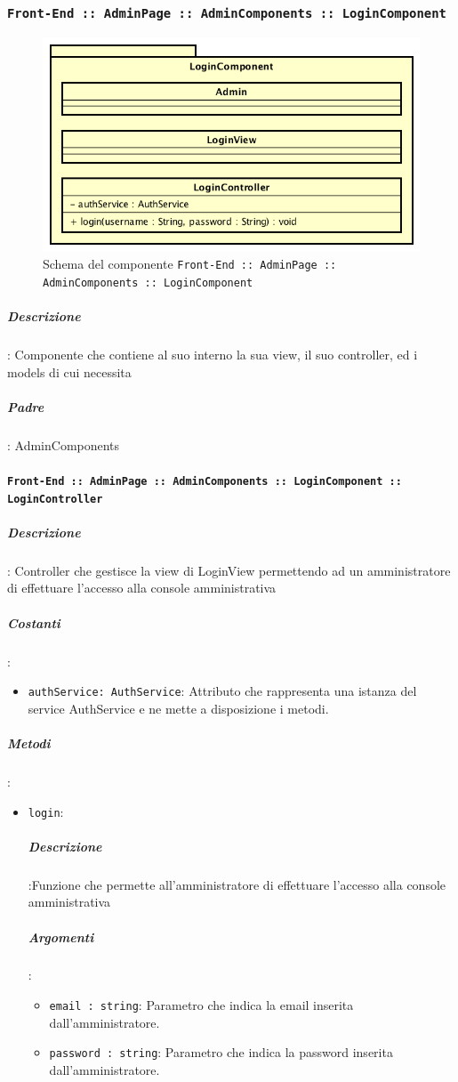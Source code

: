 \documentclass[../DefinizioneDiProdotto_v3.0.0.tex]{subfiles}
\begin{document}
\newpage
	\subsubsection{\texttt{Front-End :: AdminPage :: AdminComponents :: LoginComponent}}
	\begin{figure}[!h]
		\centering
		\includegraphics[scale=0.7]{Architettura/Front-End/AdminPage/AdminComponents/LoginComponent.png}
		\caption{Schema del componente \texttt{Front-End :: AdminPage :: AdminComponents :: LoginComponent}}
	\end{figure}
			\subparagraph{Descrizione}: Componente che contiene al suo interno la sua view, il suo controller, ed i models di cui necessita
			\subparagraph{Padre}: AdminComponents
			\paragraph{\texttt{Front-End :: AdminPage :: AdminComponents :: LoginComponent :: LoginController}}
				\subparagraph{Descrizione}: Controller che gestisce la view di LoginView permettendo ad un amministratore di effettuare l'accesso alla console amministrativa
				\subparagraph{Costanti}:
				\begin{itemize}
					\item \texttt{authService: AuthService}: Attributo che rappresenta una istanza del service AuthService e ne mette a disposizione i metodi.
				\end{itemize}
				\subparagraph{Metodi}:
				\begin{itemize}
					\item \texttt{login}:
					\subparagraph{Descrizione}:Funzione che permette all'amministratore di effettuare l'accesso alla console amministrativa
					\subparagraph{Argomenti}:
					\begin{itemize}
						\item \texttt{email : string}: Parametro che indica la email inserita dall'amministratore.
						\item \texttt{password : string}: Parametro che indica la password inserita dall'amministratore.
					\end{itemize}
				\end{itemize}\vspace{0.5em}
\end{document}
